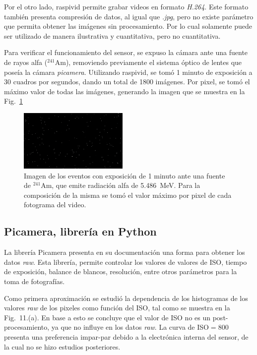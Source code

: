 \documentclass[twoside,twocolumn]{article}
\begin{document}
    Por el otro lado, raspivid permite grabar videos en formato \emph{H.264}.
    Este formato también presenta compresión de datos, al igual que \emph{.jpg},
    pero no existe parámetro que permita obtener las imágenes sin procesamiento.
    Por lo cual solamente puede ser utilizado de manera ilustrativa y cuantitativa,
    pero no cuantitativa.

    Para verificar el funcionamiento del sensor, se expuso la cámara ante una fuente de rayos alfa ($^{241}$Am),
    removiendo previamente el sistema óptico de lentes que poseía la cámara \emph{picamera}.
    Utilizando raspivid, se tomó 1 minuto de exposición a 30 cuadros por segundos, dando un total de 1800 imágenes.
    Por pixel, se tomó el máximo valor de todas las imágenes, generando la imagen que se muestra en la Fig.~\ref{fig:raspivid}

    \begin{figure}[h]
      \includegraphics[width=0.47\textwidth]{figures/Alpha_1m.png}
      \caption{Imagen de los eventos con exposición de 1 minuto ante una fuente de $^{241}$Am,
      que emite radiación alfa de \SI{5.486}{\mega\eV}.
      Para la composición de la misma se tomó el valor máximo por pixel de cada fotograma del video.
      }
      \label{fig:raspivid}
    \end{figure}

  \subsection*{Picamera, librería en Python}
    La librería Picamera presenta en su documentación una forma para obtener los datos \emph{raw}\cite{picamera}.
    Esta librería, permite controlar los valores de valores de ISO, tiempo de exposición,
    balance de blancos, resolución, entre otros parámetros para la toma de fotografías.

    Como primera aproximación se estudió la dependencia de los histogramas de los valores \emph{raw} de los pixeles
    como función del ISO, tal como se muestra en la Fig.~11.(a).
    En base a esto se concluye que el valor de ISO no es un post-procesamiento, ya que no influye en los datos \emph{raw}.
    La curva de ISO$=800$ presenta una preferencia impar-par debido a la electrónica interna del sensor,
    de la cual no se hizo estudios posteriores.
\end{document}
